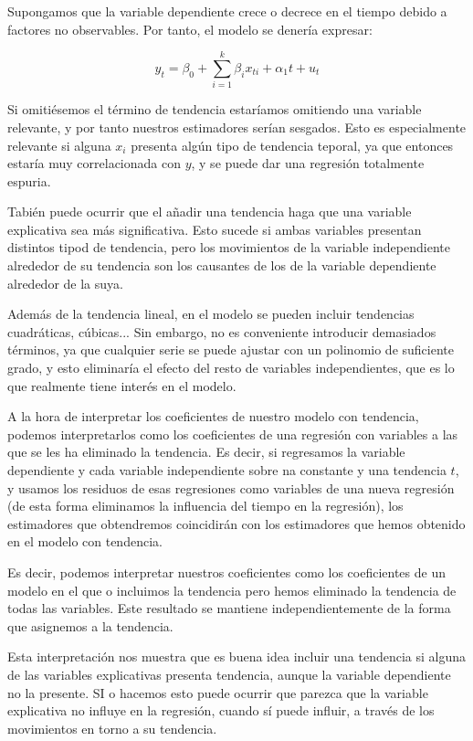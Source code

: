 Supongamos que la variable dependiente crece o decrece en el tiempo debido a factores no observables. Por tanto, el modelo se dener\'ia expresar:

\[y_t=\beta_0+\sum_{i=1}^{k}\beta_ix_{ti}+\alpha_1t+u_t\]

Si omiti\'esemos el t\'ermino de tendencia estar\'iamos omitiendo una variable relevante, y por tanto nuestros estimadores ser\'ian sesgados. Esto es especialmente relevante si alguna $x_i$ presenta alg\'un tipo de tendencia teporal, ya que entonces estar\'ia muy correlacionada con $y$, y se puede dar una regresi\'on totalmente espuria.

Tabi\'en puede ocurrir que el a\~nadir una tendencia haga que una variable explicativa sea m\'as significativa. Esto sucede si ambas variables presentan distintos tipod de tendencia, pero los movimientos de la variable independiente alrededor de su tendencia son los causantes de los de la variable dependiente alrededor de la suya.

Adem\'as de la tendencia lineal, en el modelo se pueden incluir tendencias cuadr\'aticas, c\'ubicas... Sin embargo, no es conveniente introducir demasiados t\'erminos, ya que cualquier serie se puede ajustar con un polinomio de suficiente grado, y esto eliminar\'ia el efecto del resto de variables independientes, que es lo que realmente tiene inter\'es en el modelo.


A la hora de interpretar los coeficientes de nuestro modelo con tendencia, podemos interpretarlos como los coeficientes de una regresi\'on con variables a las que se les ha eliminado la tendencia. Es decir, si regresamos la variable dependiente y cada variable independiente sobre na constante y una tendencia $t$, y usamos los residuos de esas regresiones como variables de una nueva regresi\'on (de esta forma eliminamos la influencia del tiempo en la regresi\'on), los estimadores que obtendremos coincidir\'an con los estimadores que hemos obtenido en el modelo con tendencia.

Es decir, podemos interpretar nuestros coeficientes como los coeficientes de un modelo en el que o incluimos la tendencia pero hemos eliminado la tendencia de todas las variables. Este resultado se mantiene independientemente de la forma que asignemos a la tendencia.

Esta interpretaci\'on nos muestra que es buena idea incluir una tendencia si alguna de las variables explicativas presenta tendencia, aunque la variable dependiente no la presente. SI o hacemos esto puede ocurrir que parezca que la variable explicativa no influye en la regresi\'on, cuando s\'i puede influir, a trav\'es de los movimientos en torno a su tendencia.

